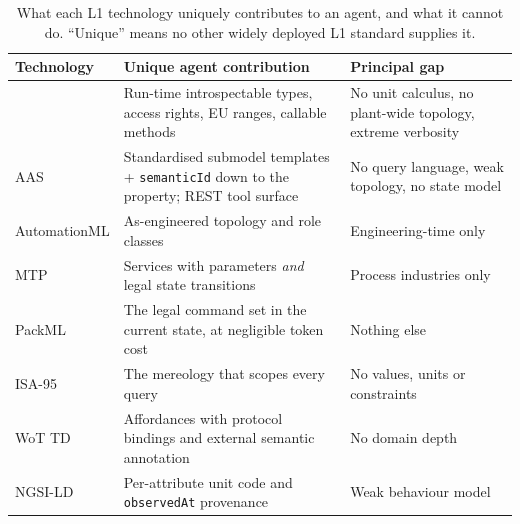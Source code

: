 \begin{table}[t]
\centering
\caption{What each L1 technology uniquely contributes to an agent, and what it
cannot do. ``Unique'' means no other widely deployed L1 standard supplies it.}
\label{tab:l1-summary}
\footnotesize
\begin{tabular}{@{}lp{5.6cm}p{5.6cm}@{}}
\toprule
\textbf{Technology} & \textbf{Unique agent contribution} & \textbf{Principal gap} \\
\midrule
\opcua{} & Run-time introspectable types, access rights, EU ranges, callable
methods & No unit calculus, no plant-wide topology, extreme verbosity \\
AAS & Standardised submodel templates + \texttt{semanticId} down to the property;
REST tool surface & No query language, weak topology, no state model \\
AutomationML & As-engineered topology and role classes & Engineering-time only \\
MTP & Services with parameters \emph{and} legal state transitions & Process
industries only \\
PackML & The legal command set in the current state, at negligible token cost &
Nothing else \\
ISA-95 & The mereology that scopes every query & No values, units or constraints \\
WoT TD & Affordances with protocol bindings and external semantic annotation &
No domain depth \\
NGSI-LD & Per-attribute unit code and \texttt{observedAt} provenance & Weak
behaviour model \\
\bottomrule
\end{tabular}
\end{table}
